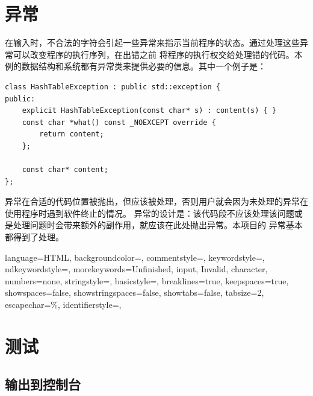 
\chapter{异常}
在输入时，不合法的字符会引起一些异常来指示当前程序的状态。通过处理这些异常可以改变程序的执行序列，在出错之前%
将程序的执行权交给处理错的代码。本例的数据结构和系统都有异常类来提供必要的信息。其中一个例子是：
\begin{lstlisting}[firstnumber=244, caption=HashTableException 异常类]
class HashTableException : public std::exception {
public:
    explicit HashTableException(const char* s) : content(s) { }
    const char *what() const _NOEXCEPT override {
        return content;
    };

    const char* content;
};
\end{lstlisting}

异常在合适的代码位置被抛出，但应该被处理，否则用户就会因为未处理的异常在使用程序时遇到软件终止的情况。%
异常的设计是：该代码段不应该处理该问题或是处理问题时会带来额外的副作用，就应该在此处抛出异常。本项目的%
异常基本都得到了处理。


 {
    language=HTML,
    backgroundcolor=\color{CPPDark},   
    commentstyle=\color{CPPLight},
    keywordstyle=\color{red},
    ndkeywordstyle={},
    morekeywords={Unfinished, input, Invalid, character},
    numbers=none,
    stringstyle={},
    basicstyle=\fira\color{white}\tiny,
    breaklines=true,                                     
    keepspaces=true,                                     
    showspaces=false,                
    showstringspaces=false,
    showtabs=false,                  
    tabsize=2,
    escapechar=\%,
    identifierstyle={},
}

\chapter{测试}

\section{输出到控制台}


